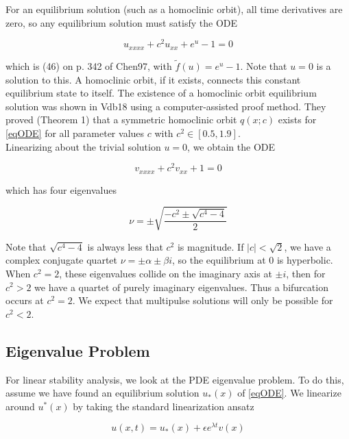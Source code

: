 \documentclass[12pt]{article}
\begin{document}
For an equilibrium solution (such as a homoclinic orbit), all time derivatives are zero, so any equilibrium solution must satisfy the ODE

\begin{equation}\label{eqODE}
u_{xxxx} + c^2 u_{xx} + e^{u} - 1 = 0
\end{equation}

which is (46) on p. 342 of Chen97, with $\tilde{f}(u) = e^u - 1$. Note that $u = 0$ is a solution to this. A homoclinic orbit, if it exists, connects this constant equilibrium state to itself. The existence of a homoclinic orbit equilibrium solution was shown in Vdb18 using a computer-assisted proof method. They proved (Theorem 1) that a symmetric homoclinic orbit $q(x; c)$ exists for \eqref{eqODE} for all parameter values $c$ with $c^2 \in [0.5, 1.9]$.\\

Linearizing about the trivial solution $u = 0$, we obtain the ODE

\begin{equation}
v_{xxxx} + c^2 v_{xx} + 1 = 0
\end{equation}

which has four eigenvalues

\begin{equation}
\nu = \pm \sqrt{\frac{-c^2 \pm \sqrt{c^4 - 4}}{2} }
\end{equation}

Note that $\sqrt{c^4 - 4}$ is always less that $c^2$ is magnitude. If $|c| < \sqrt{2}$, we have a complex conjugate quartet $\nu = \pm \alpha \pm \beta i$, so the equilibrium at 0 is hyperbolic. When $c^2 = 2$, these eigenvalues collide on the imaginary axis at $\pm i$, then for $c^2 > 2$ we have a quartet of purely imaginary eigenvalues. Thus a bifurcation occurs at $c^2 = 2$. We expect that multipulse solutions will only be possible for $c^2 < 2$.

\subsection{Eigenvalue Problem}

For linear stability analysis, we look at the PDE eigenvalue problem. To do this, assume we have found an equilibrium solution $u_*(x)$ of \eqref{eqODE}. We linearize around $u^*(x)$ by taking the standard linearization ansatz

\begin{equation}
u(x,t) = u_*(x) + \epsilon e^{\lambda t} v(x)
\end{equation}
\end{document}
